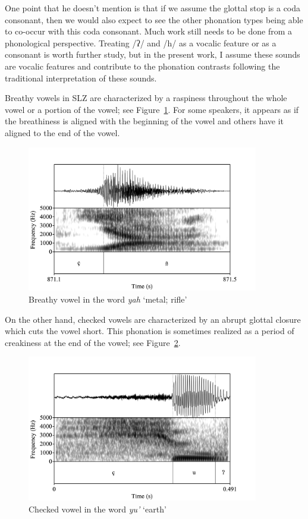 \documentclass[12pt, letterpaper]{article}
\begin{document}
One point that he doesn't mention is that if we assume the glottal stop is a coda consonant, then we would also expect to see the other phonation types being able to co-occur with this coda consonant. Much work still needs to be done from a phonological perspective. Treating /ʔ/ and /h/ as a vocalic feature or as a consonant is worth further study, but in the present work, I assume these sounds are vocalic features and contribute to the phonation contrasts following the traditional interpretation of these sounds. 

Breathy vowels in SLZ are characterized by a raspiness throughout the whole vowel or a portion of the vowel; see Figure~\ref{fig:BreathyVowel}. For some speakers, it appears as if the breathiness is aligned with the beginning of the vowel and others have it aligned to the end of the vowel. 

\begin{figure}[!h]
	\centering
	\includegraphics[width=0.9\textwidth]{Images/yah.png}
	\caption{Breathy vowel in the word \textit{yah} `metal; rifle'}
	\label{fig:BreathyVowel}
\end{figure}

On the other hand, checked vowels are characterized by an abrupt glottal closure which cuts the vowel short. This phonation is sometimes realized as a period of creakiness at the end of the vowel; see Figure~\ref{fig:CheckedVowel}.  

\begin{figure}[!h]
	\centering
	\includegraphics[width=0.9\textwidth]{Images/RD_yu'.png}
	\caption{Checked vowel in the word \textit{yu'} `earth'}
	\label{fig:CheckedVowel}
\end{figure}
\end{document}
